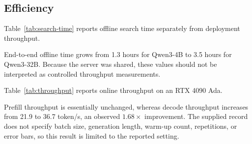 \subsection{Efficiency}

Table~\ref{tab:search-time} reports offline search time separately from deployment throughput.


End-to-end offline time grows from 1.3 hours for Qwen3-4B to 3.5 hours for Qwen3-32B. Because the server was shared, these values should not be interpreted as controlled throughput measurements.

Table~\ref{tab:throughput} reports online throughput on an RTX 4090 Ada.


Prefill throughput is essentially unchanged, whereas decode throughput increases from 21.9 to 36.7 token/s, an observed $1.68\times$ improvement. The supplied record does not specify batch size, generation length, warm-up count, repetitions, or error bars, so this result is limited to the reported setting.
